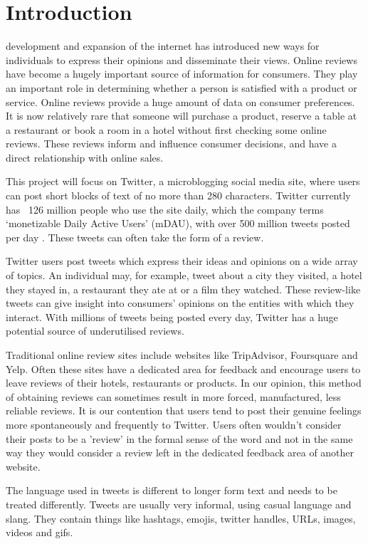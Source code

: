 \section{Introduction}
 development and expansion of the internet has introduced new ways for individuals to express their opinions and disseminate their views. Online reviews have become a hugely important source of information for consumers. They play an important role in determining whether a person is satisfied with a product or service. Online reviews provide a huge amount of data on consumer preferences. It is now relatively rare that someone will purchase a product, reserve a table at a restaurant or book a room in a hotel without first checking some online reviews. These reviews inform and influence consumer decisions, and have a direct relationship with online sales. 

This project will focus on Twitter, a microblogging social media site, where users can post short blocks of text of no more than 280 characters. Twitter currently has ~126 million people who use the site daily, which the company terms `monetizable Daily Active Users' (mDAU), with over 500 million tweets posted per day \cite{Twitter2019}. These tweets can often take the form of a review.

Twitter users post tweets which express their ideas and opinions on a wide array of topics. An individual may, for example, tweet about a city they visited, a hotel they stayed in, a restaurant they ate at or a film they watched. These review-like tweets can give insight into consumers' opinions on the entities with which they interact. With millions of tweets being posted every day, Twitter has a huge potential source of underutilised reviews.

Traditional online review sites include websites like TripAdvisor, Foursquare and Yelp. Often these sites have a dedicated area for feedback and encourage users to leave reviews of their hotels, restaurants or products. In our opinion, this method of obtaining reviews can sometimes result in more forced, manufactured, less reliable reviews. It is our contention that users tend to post their genuine feelings more spontaneously and frequently to Twitter. Users often wouldn't consider their posts to be a 'review' in the formal sense of the word and not in the same way they would consider a review left in the dedicated feedback area of another website.

The language used in tweets is different to longer form text and needs to be treated differently. Tweets are usually very informal, using casual language and slang. They contain things like hashtags, emojis, twitter handles, URLs, images, videos and gifs.

